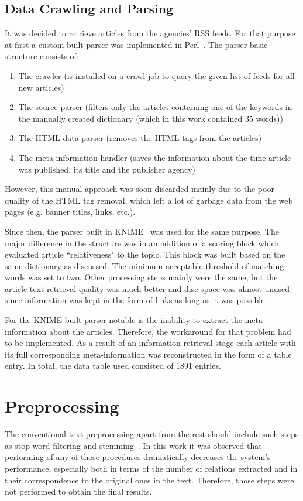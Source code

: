 \documentclass[]{article}
\begin{document}
\subsection{Data Crawling and Parsing}
%
It was decided to retrieve articles from the agencies' RSS feeds. For that purpose at first a custom built parser was implemented in Perl~\cite{perl}. The parser basic structure consists of: 
\begin{enumerate}
	\item The crawler (is installed on a crawl job to query the given list of feeds for all new articles)
	\item The source parser (filters only the articles containing one of the keywords in the manually created dictionary (which in this work contained 35 words))
	\item The HTML data parser (removes the HTML tags from the articles)
	\item The meta-information handler (saves the information about the time article was published, its title and the publisher agency)
\end{enumerate}
However, this manual approach was soon discarded mainly due to the poor quality of the HTML tag removal, which left a lot of garbage data from the web pages (e.g. banner titles, links, etc.). 

Since then, the parser built in KNIME~\cite{knime} was used for the same purpose. The major difference in the structure was in an addition of a scoring block which evaluated article ``relativeness" to the topic. This block was built based on the same dictionary as discussed. The minimum acceptable threshold of matching words was set to two. Other processing steps mainly were the same, but the article text retrieval quality was much better and disc space was almost unused since information was kept in the form of links as long as it was possible. 

For the KNIME-built parser notable is the inability to extract the meta information about the articles. Therefore, the workaround for that problem had to be implemented. As a result of an information retrieval stage each article with its full corresponding meta-information was reconstructed in the form of a table entry. In total, the data table used consisted of 1891 entries.
%
\section{Preprocessing}
%
The conventional text preprocessing apart from the rest should include such steps as stop-word filtering and stemming~\cite{feldman}. In this work it was observed that performing of any of those procedures dramatically decreases the system's performance, especially both in terms of the number of relations extracted and in their correspondence to the original ones in the text. Therefore, those steps were not performed to obtain the final results.
\end{document}
